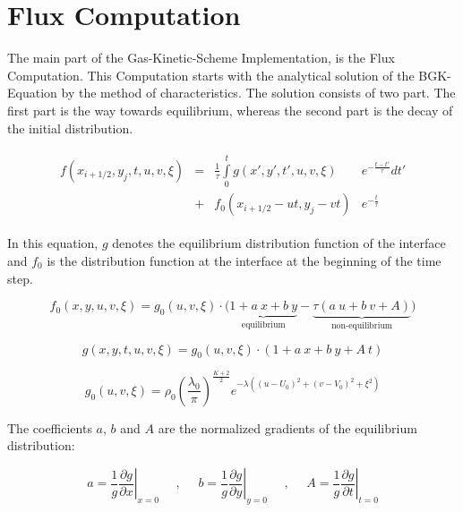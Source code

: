 \documentclass[
	pdftex,             %
	12pt,				%
	a4paper,		   	%
	english,				%
	oneside,			%
]{article}
\begin{document}
\section{Flux Computation}

The main part of the Gas-Kinetic-Scheme Implementation, is the Flux Computation. This Computation starts with the analytical solution of the BGK-Equation by the method of characteristics. The solution consists of two part. The first part is the way towards equilibrium, whereas the second part is the decay of the initial distribution. 

\begin{equation}
\begin{split}
\begin{array}{lcll}
f(x_{i+1/2}, y_j, t,u,v,\xi) 
&=&
 \frac{1}{\tau} \int \limits_0^t
g(x', y', t', u, v, \xi) &e^{-\tfrac{t-t'}{\tau}} dt'
\\
&+& f_0(x_{i+1/2} - ut, y_j - vt) &e^{-\tfrac{t}{\tau}}
\end{array}
\end{split}
\end{equation}

In this equation, $g$ denotes the equilibrium distribution function of the interface and $f_0$ is the distribution function at the interface at the beginning of the time step. 

\begin{equation}
f_0(x,y,u,v,\xi) = g_0(u,v,\xi) \cdot
\Big( 
\underbrace{ 1 + a~x + b~y }_{\text{equilibrium}}
-
\underbrace{ \tau \left( a~u + b~v + A \right) }_{\text{non-equilibrium}}
\Big)
\end{equation}

\begin{equation}
g(x,y,t,u,v,\xi) = g_0(u,v,\xi) \cdot \left( 1 + a~x + b~y + A~t \right)
\end{equation}

\begin{equation}
g_0(u,v,\xi) = \rho_0 \left( \frac{\lambda_0}{\pi} \right)^{\frac{K+2}{2}}
           e^{-\lambda ((u-U_0)^2 + (v-V_0)^2 + \xi^2)}
\end{equation}

The coefficients $a$, $b$ and $A$ are the normalized gradients of the equilibrium distribution:

\begin{equation}
a = \left. \frac{1}{g} \frac{\partial g}{\partial x} \right|_{x=0} ~~~~~~,~~~~~~
b = \left. \frac{1}{g} \frac{\partial g}{\partial y} \right|_{y=0} ~~~~~~,~~~~~~
A = \left. \frac{1}{g} \frac{\partial g}{\partial t} \right|_{t=0}
\end{equation}
\end{document}
